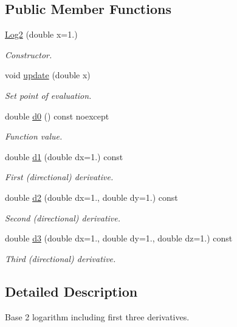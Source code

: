 \subsection*{Public Member Functions}
\begin{DoxyCompactItemize}
\item 
\hyperlink{structfuncy_1_1Log2_a34da09dbfb036944cbe9e360a777d116}{Log2} (double x=1.)
\begin{DoxyCompactList}\small\item\em Constructor. \end{DoxyCompactList}\item 
void \hyperlink{structfuncy_1_1Log2_abd8eace8e04d90a0db04eed4e89c435b}{update} (double x)
\begin{DoxyCompactList}\small\item\em Set point of evaluation. \end{DoxyCompactList}\item 
double \hyperlink{structfuncy_1_1Log2_a0a5d8bc6f3d5a834e593b43ed124ba57}{d0} () const noexcept
\begin{DoxyCompactList}\small\item\em Function value. \end{DoxyCompactList}\item 
double \hyperlink{structfuncy_1_1Log2_a62bea2dcafddbb9930f7c445ae193bb4}{d1} (double dx=1.) const 
\begin{DoxyCompactList}\small\item\em First (directional) derivative. \end{DoxyCompactList}\item 
double \hyperlink{structfuncy_1_1Log2_a4026293336992a23fc654666a84dd3fa}{d2} (double dx=1., double dy=1.) const 
\begin{DoxyCompactList}\small\item\em Second (directional) derivative. \end{DoxyCompactList}\item 
double \hyperlink{structfuncy_1_1Log2_a01e9818c616ff083afc3403253eeb85a}{d3} (double dx=1., double dy=1., double dz=1.) const 
\begin{DoxyCompactList}\small\item\em Third (directional) derivative. \end{DoxyCompactList}\end{DoxyCompactItemize}


\subsection{Detailed Description}
Base 2 logarithm including first three derivatives. 

